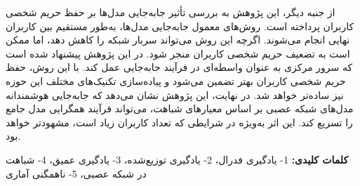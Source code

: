 \begin{small}
از جنبه دیگر، این پژوهش به بررسی تأثیر جابه‌جایی مدل‌ها بر حفظ حریم شخصی کاربران پرداخته است. روش‌های معمول جابه‌جایی مدل‌ها، به‌طور مستقیم بین کاربران نهایی انجام می‌شوند. اگرچه این روش می‌تواند سربار شبکه را کاهش دهد، اما ممکن است به تضعیف حریم شخصی کاربران منجر شود. در این پژوهش پیشنهاد شده است که سرور مرکزی به عنوان واسطه‌ای در فرآیند جابه‌جایی عمل کند. با این روش، حفظ حریم شخصی کاربران بهتر تضمین می‌شود و پیاده‌سازی تکنیک‌های مختلف این حوزه نیز ساده‌تر خواهد شد.
در نهایت، این پژوهش نشان می‌دهد که جابه‌جایی هوشمندانه مدل‌های شبکه عصبی بر اساس معیارهای شباهت، می‌تواند فرآیند همگرایی مدل جامع را تسریع کند. این اثر به‌ویژه در شرایطی که تعداد کاربران زیاد است، مشهودتر خواهد بود.



\vspace{5mm}
\noindent\textbf{کلمات کلیدی:}
1- یادگیری فدرال،
2- یادگیری توزیع‌شده،
3- یادگیری عمیق،
4- شباهت در شبکه عصبی،
5- ناهمگنی آماری
\end{small}